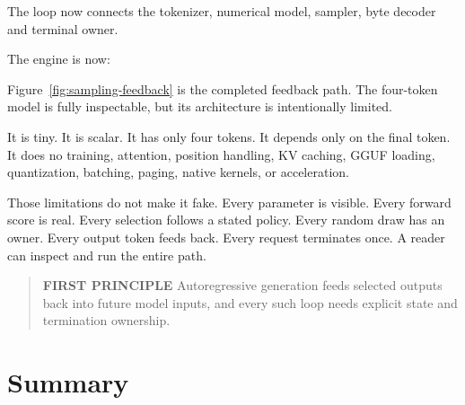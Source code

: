 The loop now connects the tokenizer, numerical model, sampler, byte decoder and terminal owner.

The engine is now:

Figure~\ref{fig:sampling-feedback} is the completed feedback path. The four-token model is fully inspectable, but its architecture is intentionally limited.

It is tiny. It is scalar. It has only four tokens. It depends only on
the final token. It does no training, attention, position handling, KV
caching, GGUF loading, quantization, batching, paging, native kernels,
or acceleration.

Those limitations do not make it fake. Every parameter is visible. Every
forward score is real. Every selection follows a stated policy. Every
random draw has an owner. Every output token feeds back. Every request
terminates once. A reader can inspect and run the entire path.

\begin{quote}
\textbf{FIRST PRINCIPLE} Autoregressive generation feeds selected
outputs back into future model inputs, and every such loop needs
explicit state and termination ownership.
\end{quote}

\section{Summary}\label{summary-3}


